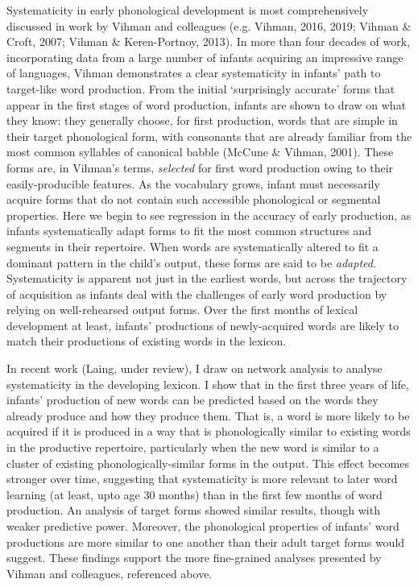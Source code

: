 \documentclass[
  man]{apa6}
\begin{document}
Systematicity in early phonological development is most comprehensively discussed in work by Vihman and colleagues (e.g. Vihman, 2016, 2019; Vihman \& Croft, 2007; Vihman \& Keren-Portnoy, 2013). In more than four decades of work, incorporating data from a large number of infants acquiring an impressive range of languages, Vihman demonstrates a clear systematicity in infants' path to target-like word production. From the initial `surprisingly accurate' forms that appear in the first stages of word production, infants are shown to draw on what they know: they generally choose, for first production, words that are simple in their target phonological form, with consonants that are already familiar from the most common syllables of canonical babble (McCune \& Vihman, 2001). These forms are, in Vihman's terms, \emph{selected} for first word production owing to their easily-producible features. As the vocabulary grows, infant must necessarily acquire forms that do not contain such accessible phonological or segmental properties. Here we begin to see regression in the accuracy of early production, as infants systematically adapt forms to fit the most common structures and segments in their repertoire. When words are systematically altered to fit a dominant pattern in the child's output, these forms are said to be \emph{adapted}. Systematicity is apparent not just in the earliest words, but across the trajectory of acquisition as infants deal with the challenges of early word production by relying on well-rehearsed output forms. Over the first months of lexical development at least, infants' productions of newly-acquired words are likely to match their productions of existing words in the lexicon.

In recent work (Laing, under review), I draw on network analysis to analyse systematicity in the developing lexicon. I show that in the first three years of life, infants' production of new words can be predicted based on the words they already produce and how they produce them. That is, a word is more likely to be acquired if it is produced in a way that is phonologically similar to existing words in the productive repertoire, particularly when the new word is similar to a cluster of existing phonologically-similar forms in the output. This effect becomes stronger over time, suggesting that systematicity is more relevant to later word learning (at least, upto age 30 months) than in the first few months of word production. An analysis of target forms showed similar results, though with weaker predictive power. Moreover, the phonological properties of infants' word productions are more similar to one another than their adult target forms would suggest. These findings support the more fine-grained analyses presented by Vihman and colleagues, referenced above.
\end{document}
